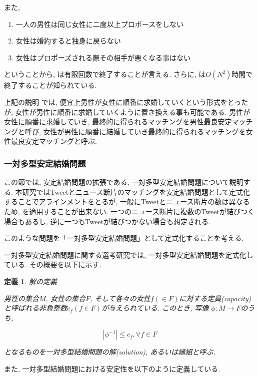 \documentclass[12pt]{jarticle}
\newtheorem{definittion}{定義}[section]
\begin{document}
また,
\begin{enumerate}
\item 一人の男性は同じ女性に二度以上プロポースをしない
\item 女性は婚約すると独身に戻らない
\item 女性はプロポーズされる際その相手が悪くなる事はない
\end{enumerate}

ということから, \gsa は有限回数で終了することが言える. さらに, \gsa は$O(N^2)$時間で終了することが知られている.

上記の説明 では, 便宜上男性が女性に順番に求婚していくという形式をとったが, 女性が男性に順番に求婚していくように置き換える事も可能である.
男性が女性に順番に求婚していき, 最終的に得られるマッチングを男性最良安定マッチングと呼び, 女性が男性に順番に結婚していき最終的に得られるマッチングを女性最良安定マッチングと呼ぶ.

\subsubsection{一対多型安定結婚問題}
この節では, 安定結婚問題の拡張である, 一対多型安定結婚問題について説明する.
本研究ではTweetとニュース断片のマッチングを安定結婚問題として定式化することでアラインメントをとるが, 一般にTweetとニュース断片の数は異なるため, \gsa を適用することが出来ない.
一つのニュース断片に複数のTweetが結びつく場合もあるし, 逆に一つもTweetが結びつかない場合も想定される.

このような問題を「一対多型安定結婚問題」として定式化することを考える.

一対多型安定結婚問題に関する選考研究\cite{psmp}では, 一対多型安定結婚問題を定式化している. その概要を以下に示す.

\begin{definittion}
\label{psmp_def_1}
解の定義

男性の集合$M$, 女性の集合$F$, そして各々の女性$f(\in F)$に対する定員(capacity)と呼ばれる非負整数$c_f(f \in F)$が与えられている. このとき, 写像 $\phi : M \rightarrow F$のうち,

\begin{equation}
| \phi^{-1} | \leq c_f, \forall f \in F
\end{equation}

となるものを一対多型結婚問題の解(solution), あるいは縁組と呼ぶ.
\end{definittion}

また, 一対多型結婚問題における安定性を以下のように定義している.
\end{document}
